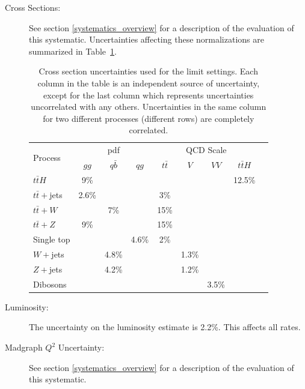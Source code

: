 \begin{description}
 \item[Cross Sections:] See section \ref{systematics_overview}
  for a description of the evaluation of this systematic.
  Uncertainties affecting these normalizations are summarized in
  Table~\ref{tab:xsUncertainty_II}.   

\begin{table}[hbtp]
\centering
\begin{tabular}{|l|c|c|c|c|c|c|c|c|}
\hline\hline
\multirow{2}{*}{Process} & \multicolumn{3}{c|}{pdf} & \multicolumn{4}{c|}{QCD Scale} \\
\cline{2-8}
                & $gg$  & $q\bar{b}$ & $qg$  & $t\bar{t}$ & $V$   & $VV$  & $t\bar{t}H$\\
\hline
$t\bar{t}H$     & 9\%   &            &       &            &       &       & 12.5\% \\
\hline
$t\bar{t}+$jets & 2.6\%   &            &       & 3\%       &       &       &      \\
\hline
$t\bar{t}+W$    &       & 7\%        &       & 15\%       &       &       &  \\
\hline
$t\bar{t}+Z$    & 9\%   &            &       & 15\%        &       &       &  \\
\hline
Single top      &       &            & 4.6\% &  2\%       &       &       &    \\
\hline
$W+$jets        &       & 4.8\%      &       &            & 1.3\% &       &   \\
\hline
$Z+$jets        &       & 4.2\%      &       &            & 1.2\% &       &  \\
\hline
Dibosons        &       &            &       &            &       & 3.5\% &  \\
\hline\hline
\end{tabular}
\caption{Cross section uncertainties used for the limit settings.  Each column in the table is an independent source of uncertainty, except for the last column which represents uncertainties uncorrelated with any others.  Uncertainties in the same column for two different processes (different rows) are completely correlated.}
\label{tab:xsUncertainty_II}
\end{table}


  \item[Luminosity:] The uncertainty on the luminosity estimate is 2.2\%.  This affects all rates.

  \item[Madgraph $Q^2$ Uncertainty:] See section \ref{systematics_overview}
  for a description of the evaluation of this systematic.


\end{description}
